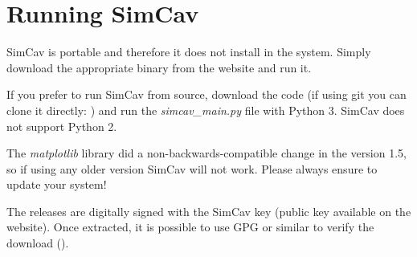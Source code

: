 \documentclass[11pt,a4paper,article,oneside]{memoir}
\begin{document}
	\section{Running SimCav}
	SimCav is portable and therefore it does not install in the system. Simply download the appropriate binary from the website and run it.
	
	If you prefer to run SimCav from source, download the code (if using git you can clone it directly: ) and run the \textit{simcav\_main.py} file with Python 3. SimCav does not support Python 2. 
	
	The \textit{matplotlib} library did a non-backwards-compatible change in the version 1.5, so if using any older version SimCav will not work. Please always ensure to update your system!
	
	The releases are digitally signed with the SimCav key (public key available on the website). Once extracted, it is possible to use GPG or similar to verify the download ().
		
	
\end{document}
